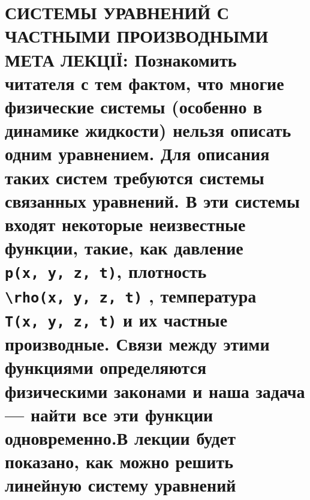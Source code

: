 \documentclass[
  ukrainian,
]{article}
\begin{document}
\section{\texorpdfstring{СИСТЕМЫ УРАВНЕНИЙ С ЧАСТНЫМИ ПРОИЗВОДНЫМИ МЕТА
ЛЕКЦІЇ: Познакомить читателя с тем фактом, что многие физические системы
(особенно в динамике жидкости) нельзя описать одним уравнением. Для
описания таких систем требуются системы связанных уравнений. В эти
системы входят некоторые неизвестные функции, такие, как давление
\texttt{p(x,\ y,\ z,\ t)}, плотность
\texttt{\textbackslash{}rho(x,\ y,\ z,\ t)} , температура
\texttt{T(x,\ y,\ z,\ t)} и их частные производные. Связи между этими
функциями определяются физическими законами и наша задача --- найти все
эти функции одновременно.В лекции будет показано, как можно решить
линейную систему
уравнений}{СИСТЕМЫ УРАВНЕНИЙ С ЧАСТНЫМИ ПРОИЗВОДНЫМИ МЕТА ЛЕКЦІЇ: Познакомить читателя с тем фактом, что многие физические системы (особенно в динамике жидкости) нельзя описать одним уравнением. Для описания таких систем требуются системы связанных уравнений. В эти системы входят некоторые неизвестные функции, такие, как давление p(x, y, z, t), плотность \textbackslash rho(x, y, z, t) , температура T(x, y, z, t) и их частные производные. Связи между этими функциями определяются физическими законами и наша задача --- найти все эти функции одновременно.В лекции будет показано, как можно решить линейную систему }}
\end{document}
